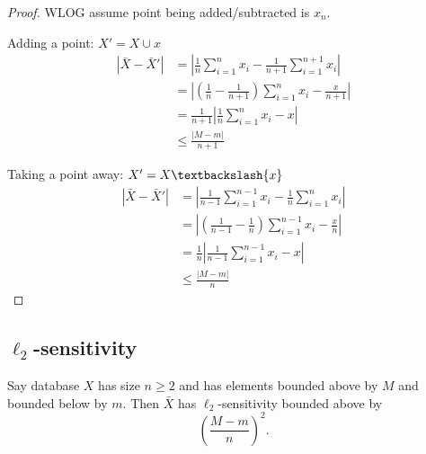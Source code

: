 \documentclass[11pt]{scrartcl} %
\begin{document}
\begin{proof}
WLOG assume point being added/subtracted is $x_n$.

Adding a point:
$X' = X \cup {x}$
\begin{align*}
\left \vert \bar{X} - \bar{X}' \right\vert &= \left\vert \frac{1}{n} \sum_{i=1}^n x_i - \frac{1}{n+1} \sum_{i=1}^{n+1} x_i \right\vert \\
	&= \left\vert \left(\frac{1}{n} - \frac{1}{n+1}\right) \sum_{i=1}^n x_i - \frac{x}{n+1}\right\vert \\
	&= \frac{1}{n+1} \left\vert \frac{1}{n} \sum_{i=1}^n x_i - x \right\vert \\
	&\le \frac{ \left\vert M - m \right\vert}{n+1}
\end{align*}

Taking a point away:
$X' = X\textbackslash\{x\}$
\begin{align*}
\left \vert \bar{X} - \bar{X}' \right\vert &= \left\vert \frac{1}{n-1} \sum_{i=1}^{n-1} x_i - \frac{1}{n} \sum_{i=1}^n x_i \right\vert \\
	&= \left\vert \left(\frac{1}{n-1} - \frac{1}{n}\right) \sum_{i=1}^{n-1} x_i - \frac{x}{n}\right\vert \\
	&= \frac{1}{n} \left\vert \frac{1}{n-1} \sum_{i=1}^{n-1} x_i  - x \right\vert \\
	&\le \frac{\left\vert M-m\right\vert}{n}
\end{align*}
\end{proof}

\subsection{$\ell_2$-sensitivity}

\begin{theorem}
	Say database $X$ has size $n \geq 2$ and has elements bounded above by $M$ and bounded below by $m$.
	Then $\bar{X}$ has $\ell_2$-sensitivity bounded above by
	$$ \left( \frac{M-m}{n} \right)^2. $$
\end{theorem}
\end{document}
